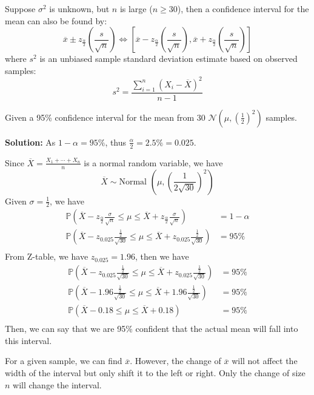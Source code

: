 Suppose \(\sigma^2\) is unknown, but \(n\) is large (\(n \geq 30\)), then a confidence interval for the mean can also be found by:
\[
  \overline{x} \pm z_{\frac{\alpha}{2}}\left(\frac{s}{\sqrt{n}}\right) \Longleftrightarrow \left[\overline{x} - z_{\frac{\alpha}{2}}\left(\frac{s}{\sqrt{n}}\right), \overline{x} + z_{\frac{\alpha}{2}}\left(\frac{s}{\sqrt{n}}\right)\right]
\]
where \(s^2\) is an unbiased sample standard deviation estimate based on observed samples:
\[
  s^2 = \dfrac{\sum_{i = 1}^n (X_i - \overline{X})^2}{n - 1}
\]

\begin{eg}
  Given a 95\% confidence interval for the mean from 30 \(\mathcal{N} \left(\mu, \left(\frac{1}{2}\right)^2\right)\) samples. 

  \textbf{Solution:} 
  As \(1 - \alpha = 95\%\), thus \(\frac{\alpha}{2} = 2.5\% = 0.025\). 

  Since \(\overline{X} = \frac{X_1 + \cdots + X_n}{n}\) is a normal random variable, we have
  \[
    \overline{X} \sim \text{Normal }\left(\mu, \left(\frac{1}{2\sqrt{30}}\right)^2\right)
  \]
  Given \(\sigma = \frac{1}{2}\), we have 
  \[
  \begin{aligned}
    \mathbb{P}\left(\overline{X} - z_{\frac{\alpha}{2}} \frac{\sigma}{\sqrt{n}} \leq \mu \leq \overline{X} + z_{\frac{\alpha}{2}} \frac{\sigma}{\sqrt{n}}\right) &= 1 - \alpha \\
    \mathbb{P}\left(\overline{X} - z_{0.025} \frac{\frac{1}{2}}{\sqrt{30}} \leq \mu \leq \overline{X} + z_{0.025} \frac{\frac{1}{2}}{\sqrt{30}}\right) &= 95\% \\
  \end{aligned}
  \]
  From Z-table, we have \(z_{0.025} = 1.96\), then we have 
  \[
  \begin{aligned}
    \mathbb{P}\left(\overline{X} - z_{0.025} \frac{\frac{1}{2}}{\sqrt{30}} \leq \mu \leq \overline{X} + z_{0.025} \frac{\frac{1}{2}}{\sqrt{30}}\right) &= 95\% \\
    \mathbb{P}\left(\overline{X} - 1.96 \frac{\frac{1}{2}}{\sqrt{30}} \leq \mu \leq \overline{X} + 1.96 \frac{\frac{1}{2}}{\sqrt{30}}\right) &= 95\% \\
    \mathbb{P}\left(\overline{X} - 0.18 \leq \mu \leq \overline{X} + 0.18\right) &= 95\% \\
  \end{aligned}
  \]
  Then, we can say that we are 95\% confident that the actual mean will fall into this interval. 
  \begin{remark}
    For a given sample, we can find \(\overline{x}\). However, the change of \(\overline{x}\) will not affect the width of the interval but only shift it to the left or right. Only the change of size \(n\) will change the interval. 
  \end{remark}
\end{eg}

